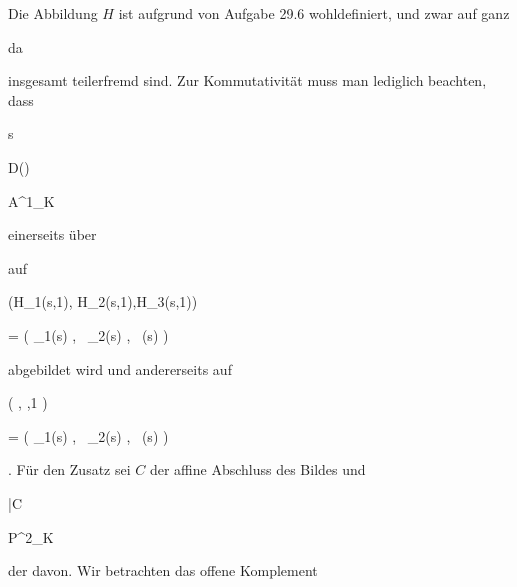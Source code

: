 {


Die Abbildung $H$ ist aufgrund von
Aufgabe 29.6
wohldefiniert, und zwar auf ganz

 da

 insgesamt teilerfremd sind. Zur Kommutativität muss man lediglich beachten, dass


\mavergleichskette

{\vergleichskette

{s
}

{ \in }{ D(\psi)
}

{ \subseteq }{ {\mathbb A}^{1}_{K}
}

{    }{
}

{   }{
}

}
{}{}{}
einerseits über

 auf


\mavergleichskettedisp

{\vergleichskette

{ (H_1(s,1), H_2(s,1),H_3(s,1))
}

{ =} { \left(  \varphi_1(s)  , \,   \varphi_2(s)  , \,   \psi(s)                 \right)
}

{ } {
}

{ } {
}

{ } {
}

}
{}{}{}
abgebildet wird und andererseits auf


\mavergleichskettedisp

{\vergleichskette

{ \left( ,   ,1 \right)
}

{ =} { \left(  \varphi_1(s)  , \,   \varphi_2(s)  , \,   \psi(s)                 \right)
}

{ } {
}

{ } {
}

{ } {
}

}
{}{}{.}
Für den Zusatz sei $C$ der affine Abschluss des Bildes und


\mavergleichskette

{\vergleichskette

{\bar{C}
}

{ \subset }{ {\mathbb P}^{2}_{K}
}

{  }{
}

{    }{
}

{   }{
}

}
{}{}{}
der
davon. Wir betrachten das offene Komplement


}
